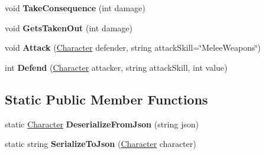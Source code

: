 \begin{DoxyCompactItemize}
\item 
\hypertarget{class_dungeon_crawler_1_1_character_1_1_character_a6c2305e906fbcf5b7bd581c7f695318d}{}void {\bfseries Take\+Consequence} (int damage)\label{class_dungeon_crawler_1_1_character_1_1_character_a6c2305e906fbcf5b7bd581c7f695318d}

\item 
\hypertarget{class_dungeon_crawler_1_1_character_1_1_character_ace129083908dc966bce4cbae4c8048c9}{}void {\bfseries Gets\+Taken\+Out} (int damage)\label{class_dungeon_crawler_1_1_character_1_1_character_ace129083908dc966bce4cbae4c8048c9}

\item 
\hypertarget{class_dungeon_crawler_1_1_character_1_1_character_a30c222f247a9a27fb69d5cb3cb9f5b30}{}void {\bfseries Attack} (\hyperlink{class_dungeon_crawler_1_1_character_1_1_character}{Character} defender, string attack\+Skill=\char`\"{}Melee\+Weapons\char`\"{})\label{class_dungeon_crawler_1_1_character_1_1_character_a30c222f247a9a27fb69d5cb3cb9f5b30}

\item 
\hypertarget{class_dungeon_crawler_1_1_character_1_1_character_a1889e5c63a8e9fd233be9f5c4a0acfc3}{}int {\bfseries Defend} (\hyperlink{class_dungeon_crawler_1_1_character_1_1_character}{Character} attacker, string attack\+Skill, int value)\label{class_dungeon_crawler_1_1_character_1_1_character_a1889e5c63a8e9fd233be9f5c4a0acfc3}

\end{DoxyCompactItemize}
\subsection*{Static Public Member Functions}
\begin{DoxyCompactItemize}
\item 
\hypertarget{class_dungeon_crawler_1_1_character_1_1_character_afa98f6089012bcc1077fbae13e6abfd5}{}static \hyperlink{class_dungeon_crawler_1_1_character_1_1_character}{Character} {\bfseries Deserialize\+From\+Json} (string json)\label{class_dungeon_crawler_1_1_character_1_1_character_afa98f6089012bcc1077fbae13e6abfd5}

\item 
\hypertarget{class_dungeon_crawler_1_1_character_1_1_character_a0e4ae66b1518972809a7e41a59b0be36}{}static string {\bfseries Serialize\+To\+Json} (\hyperlink{class_dungeon_crawler_1_1_character_1_1_character}{Character} character)\label{class_dungeon_crawler_1_1_character_1_1_character_a0e4ae66b1518972809a7e41a59b0be36}

\end{DoxyCompactItemize}
